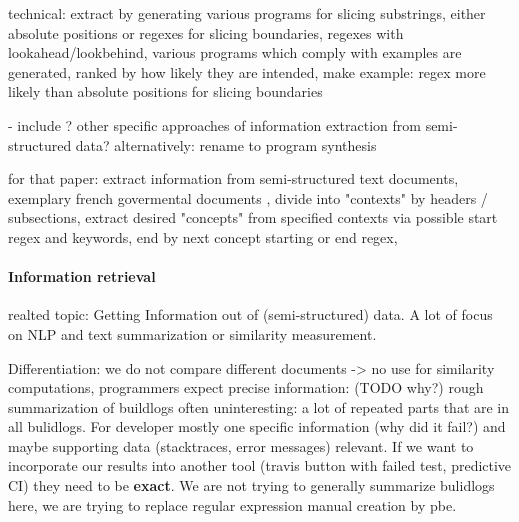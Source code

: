 \documentclass[\myrootdir/main.tex]{subfiles}
\begin{document}
technical: extract by generating various programs for slicing substrings, either absolute positions or regexes for slicing boundaries, regexes with lookahead/lookbehind, various programs which comply with examples are generated, ranked by how likely they are intended, make example: regex more likely than absolute positions for slicing boundaries

- include \cite{smith1997information}? other specific approaches of information extraction from semi-structured data? alternatively: rename to program synthesis

for that paper: extract information from semi-structured text documents, exemplary french govermental documents , divide into "contexts" by headers / subsections, extract desired "concepts" from specified contexts via possible start regex and keywords, end by next concept starting or end regex, 

\paragraph{Information retrieval}
realted topic: Getting Information out of (semi-structured) data. A lot of focus on NLP and text summarization or similarity measurement.

Differentiation: we do not compare different documents -> no use for similarity computations, programmers expect precise information: (TODO why?) rough summarization of buildlogs often uninteresting: a lot of repeated parts that are in all bulidlogs. For developer mostly one specific information (why did it fail?) and maybe supporting data (stacktraces, error messages) relevant. If we want to incorporate our results into another tool (travis button with failed test, predictive CI) they need to be \textbf{exact}. We are not trying to generally summarize bulidlogs here, we are trying to replace regular expression manual creation by pbe.
\end{document}
